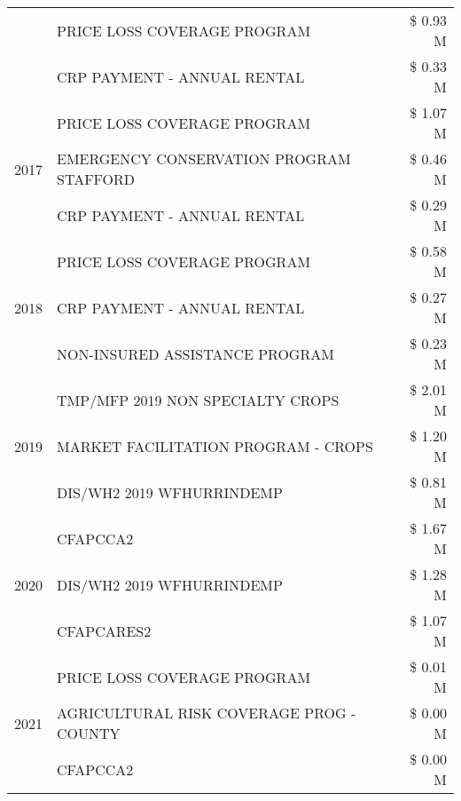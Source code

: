 \begin{tabular}{llr}
 & PRICE LOSS COVERAGE PROGRAM & \$ 0.93 M \\
 & CRP PAYMENT - ANNUAL RENTAL & \$ 0.33 M \\
\cline{1-3}
\multirow[t]{3}{*}{2017} & PRICE LOSS COVERAGE PROGRAM & \$ 1.07 M \\
 & EMERGENCY CONSERVATION PROGRAM STAFFORD & \$ 0.46 M \\
 & CRP PAYMENT - ANNUAL RENTAL & \$ 0.29 M \\
\cline{1-3}
\multirow[t]{3}{*}{2018} & PRICE LOSS COVERAGE PROGRAM & \$ 0.58 M \\
 & CRP PAYMENT - ANNUAL RENTAL & \$ 0.27 M \\
 & NON-INSURED ASSISTANCE PROGRAM & \$ 0.23 M \\
\cline{1-3}
\multirow[t]{3}{*}{2019} & TMP/MFP 2019 NON SPECIALTY CROPS & \$ 2.01 M \\
 & MARKET FACILITATION PROGRAM - CROPS & \$ 1.20 M \\
 & DIS/WH2 2019 WFHURRINDEMP & \$ 0.81 M \\
\cline{1-3}
\multirow[t]{3}{*}{2020} & CFAPCCA2 & \$ 1.67 M \\
 & DIS/WH2 2019 WFHURRINDEMP & \$ 1.28 M \\
 & CFAPCARES2 & \$ 1.07 M \\
\cline{1-3}
\multirow[t]{3}{*}{2021} & PRICE LOSS COVERAGE PROGRAM & \$ 0.01 M \\
 & AGRICULTURAL RISK COVERAGE PROG - COUNTY & \$ 0.00 M \\
 & CFAPCCA2 & \$ 0.00 M \\
\cline{1-3}
\bottomrule
\end{tabular}
